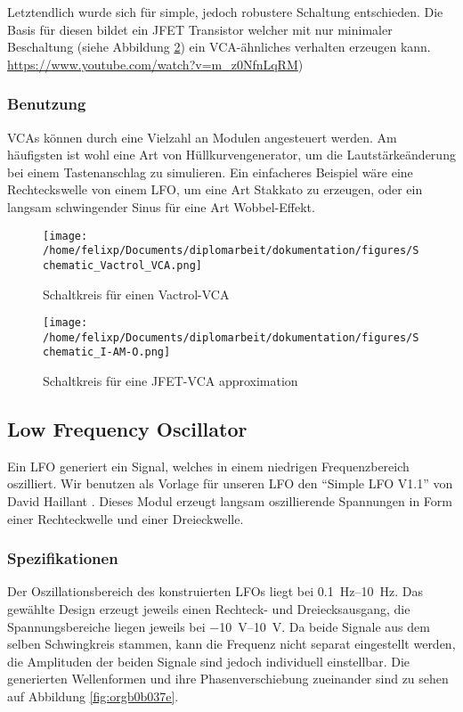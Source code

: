 Letztendlich wurde sich für simple, jedoch robustere Schaltung entschieden. Die Basis für diesen bildet ein JFET Transistor welcher mit nur minimaler Beschaltung (siehe Abbildung \ref{fig:orgd7f3d30}) ein \ac{VCA}-ähnliches verhalten erzeugen kann. \url{https://www.youtube.com/watch?v=m\_z0NfnLqRM})

\subsubsection{Benutzung}
\label{sec:orgf9467b7}
\acp{VCA} können durch eine Vielzahl an Modulen angesteuert werden. Am häufigsten ist wohl eine Art von Hüllkurvengenerator, um die Lautstärkeänderung bei einem Tastenanschlag zu simulieren. Ein einfacheres Beispiel wäre eine Rechteckswelle von einem LFO, um eine Art Stakkato zu erzeugen, oder ein langsam schwingender Sinus für eine Art Wobbel-Effekt.

\begin{figure}[hp]
\centering
\texttt{[image: /home/felixp/Documents/diplomarbeit/dokumentation/figures/Schematic\_Vactrol\_VCA.png]}
\caption{\label{fig:orgfb02d84}Schaltkreis für einen Vactrol-VCA \cite{miaw:vca}}
\end{figure}

\begin{figure}[hp]
\centering
\texttt{[image: /home/felixp/Documents/diplomarbeit/dokumentation/figures/Schematic\_I-AM-O.png]}
\caption{\label{fig:orgd7f3d30}Schaltkreis für eine JFET-VCA approximation}
\end{figure}
\subsection{Low Frequency Oscillator \label{LFO}}
\label{sec:org1165b57}

Ein \ac{LFO} generiert ein Signal, welches in einem niedrigen Frequenzbereich oszilliert. Wir benutzen als Vorlage für unseren \ac{LFO} den "`Simple LFO V1.1"' von David Haillant \cite{haillant:lfo}. Dieses Modul erzeugt langsam oszillierende Spannungen in Form einer Rechteckwelle und einer Dreieckwelle.

\subsubsection{Spezifikationen}
\label{sec:org326f8b2}
Der Oszillationsbereich des konstruierten \ac{LFO}s liegt bei \SIrange{0.1}{10}{\hertz}. Das gewählte Design erzeugt jeweils einen Rechteck- und Dreiecksausgang, die Spannungsbereiche liegen jeweils bei \SIrange{-10}{10}{\volt}. Da beide Signale aus dem selben Schwingkreis stammen, kann die Frequenz nicht separat eingestellt werden, die Amplituden der beiden Signale sind jedoch individuell einstellbar. Die generierten Wellenformen und ihre Phasenverschiebung zueinander sind zu sehen auf Abbildung \ref{fig:orgb0b037e}.

